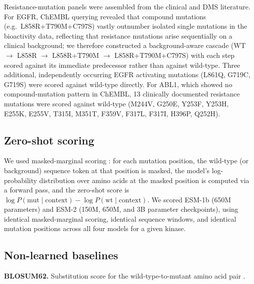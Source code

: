 \documentclass[pdflatex,sn-mathphys-num]{sn-jnl}%
\theoremstyle{thmstyleone}%
\theoremstyle{thmstyletwo}%
\theoremstyle{thmstylethree}%
\begin{document}
Resistance-mutation panels were assembled from the clinical and DMS literature. For EGFR, ChEMBL querying revealed that compound mutations (e.g.\ L858R+T790M+C797S) vastly outnumber isolated single mutations in the bioactivity data, reflecting that resistance mutations arise sequentially on a clinical background; we therefore constructed a background-aware cascade (WT $\rightarrow$ L858R $\rightarrow$ L858R+T790M $\rightarrow$ L858R+T790M+C797S) with each step scored against its immediate predecessor rather than against wild-type. Three additional, independently occurring EGFR activating mutations (L861Q, G719C, G719S) were scored against wild-type directly. For ABL1, which showed no compound-mutation pattern in ChEMBL, 13 clinically documented resistance mutations were scored against wild-type (M244V, G250E, Y253F, Y253H, E255K, E255V, T315I, M351T, F359V, F317L, F317I, H396P, Q252H).

\subsection{Zero-shot scoring}\label{subsec3-2}

We used masked-marginal scoring \citep{Meier2021}: for each mutation position, the wild-type (or background) sequence token at that position is masked, the model's log-probability distribution over amino acids at the masked position is computed via a forward pass, and the zero-shot score is $\log P(\text{mut} \mid \text{context}) - \log P(\text{wt} \mid \text{context})$. We scored ESM-1b (650M parameters) and ESM-2 (150M, 650M, and 3B parameter checkpoints), using identical masked-marginal scoring, identical sequence windows, and identical mutation positions across all four models for a given kinase.

\subsection{Non-learned baselines}\label{subsec3-3}

\textbf{BLOSUM62.} Substitution score for the wild-type-to-mutant amino acid pair \citep{Henikoff1992}.
\end{document}
